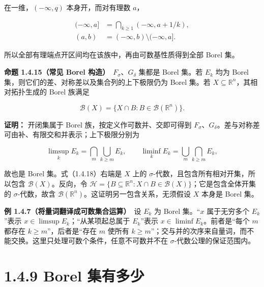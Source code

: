 \documentclass[11pt,a4paper]{article}
\begin{document}
在一维，\((-\infty,q)\) 本身开，而对有理数 \(a\)，

\begin{equation*}
\begin{aligned}
(-\infty,a]&=\bigcap_{k\geq1}(-\infty,a+1/k),\\
(a,b)&=(-\infty,b)\setminus(-\infty,a].
\end{aligned}\tag{1.4.17}
\end{equation*}

所以全部有理端点开区间均在该族中，再由可数基性质得到全部 Borel 集。

\textbf{命题 1.4.15（常见 Borel 构造）}　\(F_\sigma\)、\(G_\delta\)
集都是 Borel 集。若 \(E_k\) 均为 Borel
集，则它们的差、对称差以及集合列的上下极限仍为 Borel 集。若
\(X\subseteq\mathbb R^n\)，其相对拓扑生成的 Borel 族满足

\begin{equation*}
\mathcal B(X)=\{X\cap B:B\in\mathcal B(\mathbb R^n)\}.
\tag{1.4.18}
\end{equation*}

\textbf{证明：} 开闭集属于 Borel 族，按定义作可数并、交即可得到
\(F_\sigma\)、\(G_\delta\)。差与对称差可由补、有限交和并表示；上下极限分别为

\begin{equation*}
\limsup_kE_k=\bigcap_m\bigcup_{k\geq m}E_k,
\qquad
\liminf_kE_k=\bigcup_m\bigcap_{k\geq m}E_k,
\tag{1.4.19}
\end{equation*}

故也是 Borel 集。式（1.4.18）右端是 \(X\) 上的
\(\sigma\)-代数，且包含所有相对开集，所以包含
\(\mathcal B(X)\)。反向，令
\(\mathcal H=\{B\subseteq\mathbb R^n:X\cap B\in\mathcal B(X)\}\)；它是包含全体开集的
\(\sigma\)-代数，故含
\(\mathcal B(\mathbb R^n)\)。这证明另一包含关系，无须假设 \(X\) 本身是
Borel 集。

\textbf{例 1.4.7（将量词翻译成可数集合运算）}　设 \(E_k\) 为 Borel
集。``\(x\) 属于无穷多个 \(E_k\)''表示
\(x\in\limsup E_k\)；``从某项起总属于 \(E_k\)''表示
\(x\in\liminf E_k\)。前者是``每个 \(m\) 都存在
\(k\geq m\)''，后者是``存在 \(m\) 使所有
\(k\geq m\)''；交与并的次序来自量词，而不能交换。这里只处理可数个条件，任意不可数并不在
\(\sigma\)-代数公理的保证范围内。

\section[\S{}1.4.9 Borel 集有多少]{1.4.9 Borel 集有多少}\label{borel-ux96c6ux6709ux591aux5c11}
\end{document}
